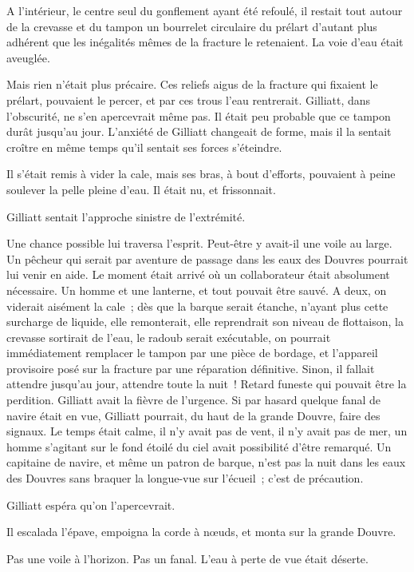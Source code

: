 \documentclass[french,twoside]{book} %
\begin{document}
A l’intérieur, le centre seul du gonflement ayant été refoulé, il restait tout autour de la crevasse et du tampon un bourrelet circulaire du prélart d’autant plus adhérent que les inégalités mêmes de la fracture le retenaient. La voie d’eau était aveuglée.\par
Mais rien n’était plus précaire. Ces reliefs aigus de la fracture qui fixaient le prélart, pouvaient le percer, et par ces trous l’eau rentrerait. Gilliatt, dans l’obscurité, ne s’en apercevrait même pas. Il était peu probable que ce tampon durât jusqu’au jour. L’anxiété de Gilliatt changeait de forme, mais il la sentait croître en même temps qu’il sentait ses forces s’éteindre.\par
Il s’était remis à vider la cale, mais ses bras, à bout d’efforts, pouvaient à peine soulever la pelle pleine d’eau. Il était nu, et frissonnait.\par
Gilliatt sentait l’approche sinistre de l’extrémité.\par
Une chance possible lui traversa l’esprit. Peut-être  y avait-il une voile au large. Un pêcheur qui serait par aventure de passage dans les eaux des Douvres pourrait lui venir en aide. Le moment était arrivé où un collaborateur était absolument nécessaire. Un homme et une lanterne, et tout pouvait être sauvé. A deux, on viderait aisément la cale ; dès que la barque serait étanche, n’ayant plus cette surcharge de liquide, elle remonterait, elle reprendrait son niveau de flottaison, la crevasse sortirait de l’eau, le radoub serait exécutable, on pourrait immédiatement remplacer le tampon par une pièce de bordage, et l’appareil provisoire posé sur la fracture par une réparation définitive. Sinon, il fallait attendre jusqu’au jour, attendre toute la nuit ! Retard funeste qui pouvait être la perdition. Gilliatt avait la fièvre de l’urgence. Si par hasard quelque fanal de navire était en vue, Gilliatt pourrait, du haut de la grande Douvre, faire des signaux. Le temps était calme, il n’y avait pas de vent, il n’y avait pas de mer, un homme s’agitant sur le fond étoilé du ciel avait possibilité d’être remarqué. Un capitaine de navire, et même un patron de barque, n’est pas la nuit dans les eaux des Douvres sans braquer la longue-vue sur l’écueil ; c’est de précaution.\par
Gilliatt espéra qu’on l’apercevrait.\par
Il escalada l’épave, empoigna la corde à nœuds, et monta sur la grande Douvre.\par
Pas une voile à l’horizon. Pas un fanal. L’eau à perte de vue était déserte.\par
\end{document}
